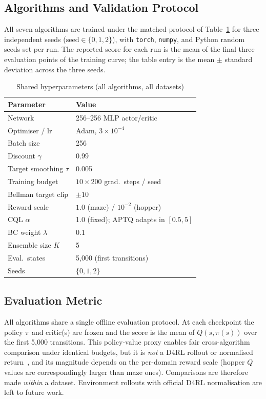 \documentclass[conference]{IEEEtran}
\begin{document}
\subsection{Algorithms and Validation Protocol}

All seven algorithms are trained under the matched protocol of
Table~\ref{tab:hparams} for three independent seeds
($\mathrm{seed}\in\{0,1,2\}$), with \texttt{torch}, \texttt{numpy}, and
Python random seeds set per run. The reported score for each run is the mean
of the final three evaluation points of the training curve; the table entry
is the mean $\pm$ standard deviation across the three seeds.

\begin{table}[t]
\centering
\caption{Shared hyperparameters (all algorithms, all datasets)}
\label{tab:hparams}
\setlength{\tabcolsep}{4pt}
\begin{tabular}{ll}
\toprule
\textbf{Parameter} & \textbf{Value} \\
\midrule
Network & 256--256 MLP actor/critic \\
Optimiser / lr & Adam, $3{\times}10^{-4}$ \\
Batch size & 256 \\
Discount $\gamma$ & 0.99 \\
Target smoothing $\tau$ & 0.005 \\
Training budget & $10 \times 200$ grad.\ steps / seed \\
Bellman target clip & $\pm 10$ \\
Reward scale & $1.0$ (maze) / $10^{-2}$ (hopper) \\
CQL $\alpha$ & 1.0 (fixed); APTQ adapts in $[0.5,5]$ \\
BC weight $\lambda$ & 0.1 \\
Ensemble size $K$ & 5 \\
Eval.\ states & 5{,}000 (first transitions) \\
Seeds & $\{0,1,2\}$ \\
\bottomrule
\end{tabular}
\end{table}

\subsection{Evaluation Metric}

All algorithms share a single offline evaluation protocol. At each
checkpoint the policy $\pi$ and critic(s) are frozen and the score is the
mean of $Q(s,\pi(s))$ over the first 5{,}000 transitions. This policy-value
proxy enables fair cross-algorithm comparison under identical budgets, but
it is \emph{not} a D4RL rollout or normalised return~\cite{fu2020d4rl}, and
its magnitude depends on the per-domain reward scale (hopper $Q$ values are
correspondingly larger than maze ones). Comparisons are therefore made
\emph{within} a dataset. Environment rollouts with official D4RL
normalisation are left to future work.
\end{document}
